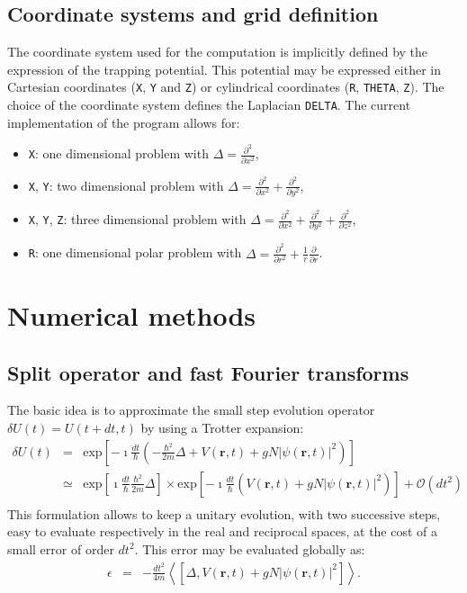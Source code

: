 \documentclass[12pt,a4paper]{report}
\newcommand{\abs}[1]{\left|#1\right|}
\newcommand{\mean}[1]{\left<#1\right>}
\renewcommand{\exp}[1]{\textrm{exp}\left[#1\right]}
\begin{document}
\section{Coordinate systems and grid definition}
The coordinate system used for the computation is implicitly defined by the expression of the trapping potential.
This potential may be expressed either in Cartesian coordinates (\texttt{X}, \texttt{Y} and \texttt{Z}) or cylindrical coordinates (\texttt{R}, \texttt{THETA}, \texttt{Z}).
The choice of the coordinate system defines the Laplacian \texttt{DELTA}.
The current implementation of the program allows for:
\begin{itemize}
\item \texttt{X}: one dimensional problem with $\Delta=\frac{\partial^2}{\partial x^2}$,
\item \texttt{X}, \texttt{Y}: two dimensional problem with $\Delta=\frac{\partial^2}{\partial x^2}+\frac{\partial^2}{\partial y^2}$,
\item \texttt{X}, \texttt{Y}, \texttt{Z}: three dimensional problem with $\Delta=\frac{\partial^2}{\partial x^2}+\frac{\partial^2}{\partial y^2}+\frac{\partial^2}{\partial z^2}$,
\item \texttt{R}: one dimensional polar problem with $\Delta=\frac{\partial^2}{\partial r^2}+\frac{1}{r}\frac{\partial}{\partial r}$.
\end{itemize}


\chapter{Numerical methods}
\section{\label{sec:integrator}Split operator and fast Fourier transforms}
The basic idea is to approximate the small step evolution operator $\delta U(t)=U(t+dt,t)$ by using a Trotter expansion:
\begin{eqnarray*}
\delta U(t)
&=&\exp{-\imath\frac{dt}{\hbar}\left(-\frac{\hbar^2}{2m}\Delta
+V(\bm{r},t)+gN\abs{\psi(\bm{r},t)}^2\right)}\\
&\simeq&\exp{\imath\frac{dt}{\hbar}\frac{\hbar^2}{2m}\Delta}
\times
\exp{-\imath\frac{dt}{\hbar}\left(V(\bm{r},t)+gN\abs{\psi(\bm{r},t)}^2\right)}
+\mathcal{O}\left(dt^2\right)\\
\end{eqnarray*}
This formulation allows to keep a unitary evolution, with two successive steps, easy to evaluate respectively in the real and reciprocal spaces, at the cost of a small error of order $dt^2$.
This error may be evaluated globally as:
\begin{eqnarray*}
\epsilon&=&-\frac{dt^2}{4m}\mean{\left[\Delta,V(\bm{r},t)+gN\abs{\psi(\bm{r},t)}^2\right]}.
\end{eqnarray*}
\end{document}
